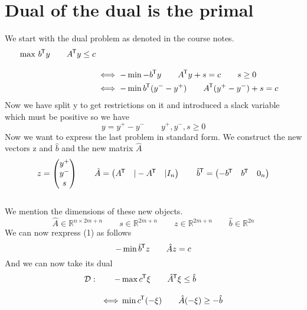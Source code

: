 \documentclass{article}
\newcommand*{\tran}{^{\mkern-1.5mu\mathsf{T}}}%
\begin{document}
	\section{Dual of the dual is the primal}
	We start with the dual problem as denoted in the course notes.
	\begin{align}
		\max \,b\tran y \qquad A\tran y \leq c\\[2ex]
		&\iff -\min-b\tran y \qquad A\tran y +s = c \qquad s\geq 0\\
		&\iff -\min b\tran (y^- - y^+) \qquad A\tran(y^+ - y^-) + s = c
	\end{align}
	Now we have split y to get restrictions on it and introduced a slack variable which must be positive so we have 
	\begin{equation}
		y = y^+ - y^- \qquad y^+, y^-,  s \geq 0
	\end{equation}
	Now we want to express the last problem in standard form. We construct the new vectors z and  $\hat b$ and the new matrix $\hat A$\\[2ex]
	\begin{equation}
		z = \begin{pmatrix} y^+ \\ y^- \\s \end{pmatrix} \qquad
		\hat A = \begin{pmatrix} A\tran &\vert -A\tran &\vert I_n\end{pmatrix}
		\qquad \hat b \tran = \begin{pmatrix} -b\tran & b\tran  & 0_n \end{pmatrix}
	\end{equation}
	\\[2ex]
	We mention the dimensions of these new objects. 
	\begin{equation}
		\hat A \in \mathbb{R}^{n\times 2m+n} \qquad s \in \mathbb{R}^{2m+n}
		\qquad z \in \mathbb{R}^{2m+n} \qquad \hat b \in \mathbb{R}^{2n}
	\end{equation}
	We can now rexpress (1) as follows 
	\begin{equation*}
		- \min \hat b\tran z \qquad \hat A z = c\\
	\end{equation*}
	And we can now take its dual 
	\begin{align*}
		\mathcal{D} : \qquad -&\max c\tran \xi  \qquad \hat A \tran \xi \leq \hat b\\[2ex]
		\iff &\min  c\tran (-\xi) \qquad \hat A (-\xi) \geq -\hat b
	\end{align*}
	
\end{document}
